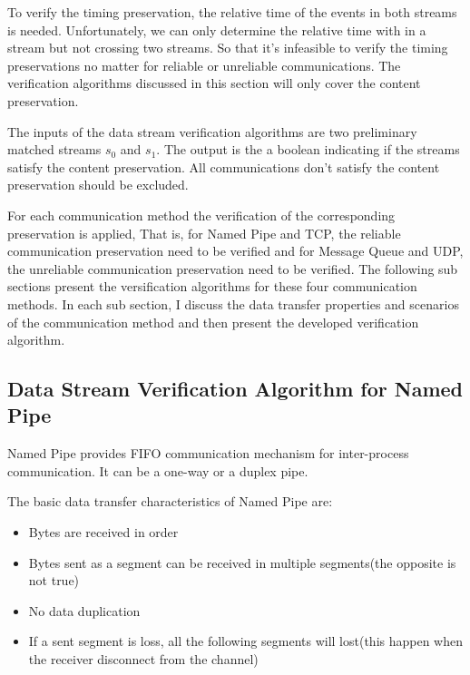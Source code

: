 To verify the timing preservation, the relative time of the events in both streams is needed. Unfortunately, we can only determine the relative time with in a stream but not crossing two streams. So that it's infeasible to verify the timing preservations no matter for reliable or unreliable communications. The verification algorithms discussed in this section will only cover the content preservation.  

The inputs of the data stream verification algorithms are two preliminary matched streams $s_0$ and $s_1$. The output is the a boolean indicating if the streams satisfy the content preservation. All communications don't satisfy the content preservation should be excluded.

For each communication method the verification of the corresponding preservation is applied, That is, for Named Pipe and TCP, the reliable communication preservation need to be verified and for Message Queue and UDP, the unreliable communication preservation need to be verified. The following sub sections present the versification  algorithms for these four communication methods. In each sub section, I discuss the data transfer properties and scenarios of the communication method and then present the developed verification algorithm.

\subsection{Data Stream Verification Algorithm for Named Pipe}
Named Pipe provides FIFO communication mechanism for inter-process communication. It can be a one-way or a duplex pipe. \cite{khambattinamed}

The basic data transfer characteristics of Named Pipe are:
\begin{itemize}
  \item Bytes are received in order
  \item Bytes sent as a segment can be received in multiple segments(the opposite is not true)
  \item No data duplication
  \item If a sent segment is loss, all the following segments will lost(this happen when the receiver disconnect from the channel) 
  
\end{itemize}

